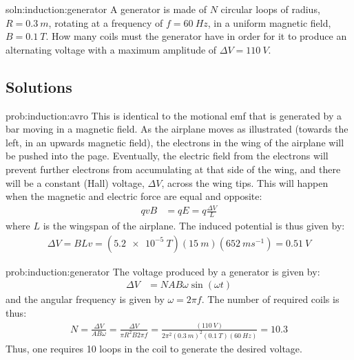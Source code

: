 \begin{problem}{soln:induction:generator}
{\label{prob:induction:generator} 
A generator is made of $N$ circular loops of radius, $R=\SI{0.3}{m}$, rotating at a frequency of $f=\SI{60}{Hz}$, in a uniform magnetic field, $B=\SI{0.1}{T}$. How many coils must the generator have in order for it to produce an alternating voltage with a maximum amplitude of $\Delta V =\SI{110}{V}$.
}
\end{problem}

\newpage
\subsection{Solutions}
\begin{solution}{prob:induction:avro}\label{soln:induction:avro}
This is identical to the motional emf that is generated by a bar moving in a magnetic field. As the airplane moves as illustrated (towards the left, in an upwards magnetic field), the electrons in the wing of the airplane will be pushed into the page. Eventually, the electric field from the electrons will prevent further electrons from accumulating at that side of the wing, and there will be a constant (Hall) voltage, $\Delta V$, across the wing tips. This will happen when the magnetic and electric force are equal and opposite:
\begin{align*}
qvB &= qE = q\frac{\Delta V}{L}
\end{align*}
where $L$ is the wingspan of the airplane. The induced potential is thus given by:
\begin{align*}
\Delta V = BLv = (\SI{5.2e-5}{T})(\SI{15}{m})(\SI{652}{ms^{-1}})=\SI{0.51}{V}
\end{align*}
\end{solution}

\begin{solution}{prob:induction:generator}\label{soln:induction:generator}
The voltage produced by a generator is given by:
\begin{align*}
\Delta V&=NAB\omega\sin(\omega t)
\end{align*}
and the angular frequency is given by $\omega = 2\pi f$. The number of required coils is thus:
\begin{align*}
N=\frac{\Delta V}{AB\omega}=\frac{\Delta V}{\pi R^2B2\pi f}=\frac{(\SI{110}{V})}{2\pi^2(\SI{0.3}{m})^2(\SI{0.1}{T})(\SI{60}{Hz})}=10.3
\end{align*}
Thus, one requires 10 loops in the coil to generate the desired voltage. 

\end{solution}

